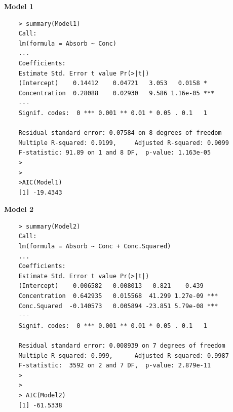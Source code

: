 \documentclass[a4paper,12pt]{article}
\begin{document}
%
%
%



\begin{framed}
	\noindent \textbf{Model 1}
	\begin{verbatim}
	> summary(Model1)
	Call:
	lm(formula = Absorb ~ Conc)
	...
	Coefficients:
	Estimate Std. Error t value Pr(>|t|)
	(Intercept)    0.14412    0.04721   3.053   0.0158 *
	Concentration  0.28088    0.02930   9.586 1.16e-05 ***
	---
	Signif. codes:  0 *** 0.001 ** 0.01 * 0.05 . 0.1   1
	
	Residual standard error: 0.07584 on 8 degrees of freedom
	Multiple R-squared: 0.9199,     Adjusted R-squared: 0.9099
	F-statistic: 91.89 on 1 and 8 DF,  p-value: 1.163e-05
	>
	>
	>AIC(Model1)
	[1] -19.4343
	\end{verbatim}
\end{framed}

\begin{framed}
	\noindent	\textbf{Model 2}
	\begin{verbatim}
	> summary(Model2)
	Call:
	lm(formula = Absorb ~ Conc + Conc.Squared)
	...
	Coefficients:
	Estimate Std. Error t value Pr(>|t|)
	(Intercept)    0.006582   0.008013   0.821    0.439
	Concentration  0.642935   0.015568  41.299 1.27e-09 ***
	Conc.Squared  -0.140573   0.005894 -23.851 5.79e-08 ***
	---
	Signif. codes:  0 *** 0.001 ** 0.01 * 0.05 . 0.1   1
	
	Residual standard error: 0.008939 on 7 degrees of freedom
	Multiple R-squared: 0.999,      Adjusted R-squared: 0.9987
	F-statistic:  3592 on 2 and 7 DF,  p-value: 2.879e-11
	>
	>
	> AIC(Model2)
	[1] -61.5338
	\end{verbatim}
\end{framed}
\end{document}
